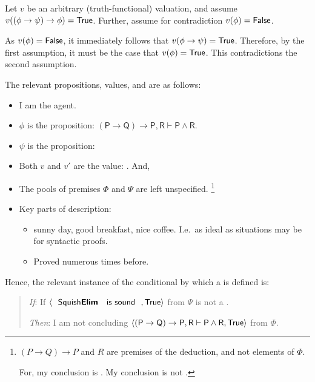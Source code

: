 \begin{note}
{    Let \(v\) be an arbitrary (truth-functional) valuation, and assume \(v((\phi \rightarrow \psi) \rightarrow \phi) = \text{\textsf{True}}\).
    Further, assume for contradiction \(v(\phi) = \text{\textsf{False}}\).

    As \(v(\phi) = \text{\textsf{False}}\), it immediately follows that \(v(\phi \rightarrow \psi) = \text{\textsf{True}}\).
    Therefore, by the first assumption, it must be the case that \(v(\phi) = \text{\textsf{True}}\).
    This contradictions the second assumption.
  }

  The relevant propositions, values, and  are as follows:
  \begin{itemize}[noitemsep]
  \item
    I am the agent.
  \item
    \(\phi\) is the proposition: \(\mathsf{(P \rightarrow Q) \rightarrow P, R \vdash P \land R}\).
  \item
    \(\psi\) is the proposition: 
  \item
    Both \(v\) and \(v'\) are the value: .
    And,
  \item
    The pools of premises \(\Phi\) and \(\Psi\) are left unspecified.%
    \footnote{
      \((P \rightarrow Q) \rightarrow P\) and \(R\) are premises of the deduction, and not elements of \(\Phi\).

      For, my conclusion is .
      My conclusion is not .
    }
  \item
    Key parts of description:
    \begin{itemize}[noitemsep]
    \item
      sunny day, good breakfast, nice coffee.
      I.e.\ as ideal as situations may be for syntactic proofs.
    \item
      Proved \sqE{} numerous times before.
    \end{itemize}
  \end{itemize}

  Hence, the relevant instance of the conditional by which a \requ{} is defined is:

  \begin{quote}
    \begin{itenum}
    \item[\emph{If}:]
      If \(\pv{\propI{\sqE{} is sound}}{\valI{True}}\) from \(\Psi\) is not a \fc{}.
    \item[\emph{Then}:]
      I am not concluding \(\langle \mathsf{(P \rightarrow Q) \rightarrow P, R \vdash P \land R}, \text{\textsf{True}} \rangle\) from \(\Phi\).
    \end{itenum}
  \end{quote}


\end{note}
